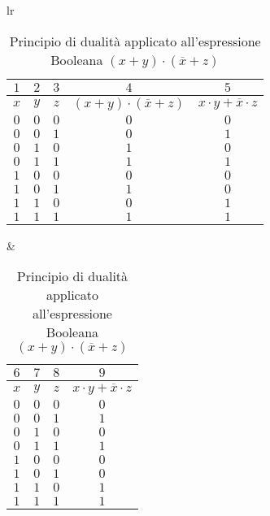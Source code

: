 \documentclass[a4paper]{extarticle}
\begin{document}
\begin{table}[H]
    \centering
    \begin{tabularx}{\textwidth}{lr}
        {
            \setlength{\tabcolsep}{8pt}
            \begin{tabularx}{0.5 \textwidth}{ccc|c|c}
                 \(1\) & \(2\) & \(3\) & \(4\) & \(5\)\\
                 \hline
                 \(x\) & \(y\) & \(z\) & \((x + y) \cdot (\overline{x} + z)\) & \(x \cdot y + \overline{x} \cdot z\)\\
                 \hline
                 \(0\) & \(0\) & \(0\) & \(0\) & \(0\)\\
                 \(0\) & \(0\) & \(1\) & \(0\) & \(1\)\\
                 \(0\) & \(1\) & \(0\) & \(1\) & \(0\)\\
                 \(0\) & \(1\) & \(1\) & \(1\) & \(1\)\\
                 \(1\) & \(0\) & \(0\) & \(0\) & \(0\)\\
                 \(1\) & \(0\) & \(1\) & \(1\) & \(0\)\\
                 \(1\) & \(1\) & \(0\) & \(0\) & \(1\)\\
                 \(1\) & \(1\) & \(1\) & \(1\) & \(1\)\\
            \end{tabularx}
        }
        &
        {
            \setlength{\tabcolsep}{8pt}
            \begin{tabularx}{0.3 \textwidth}{ccc|c}
                 \(6\) & \(7\) & \(8\) & \(9\)\\
                 \hline
                 \(x\) & \(y\) & \(z\) & \(x \cdot y + \overline{x} \cdot z\)\\
                 \hline
                 \(0\) & \(0\) & \(0\) & \(0\)\\
                 \(0\) & \(0\) & \(1\) & \(1\)\\
                 \(0\) & \(1\) & \(0\) & \(0\)\\
                 \(0\) & \(1\) & \(1\) & \(1\)\\
                 \(1\) & \(0\) & \(0\) & \(0\)\\
                 \(1\) & \(0\) & \(1\) & \(0\)\\
                 \(1\) & \(1\) & \(0\) & \(1\)\\
                 \(1\) & \(1\) & \(1\) & \(1\)\\
            \end{tabularx}
        }
    \end{tabularx}
    \caption{Principio di dualità applicato all'espressione Booleana \((x + y) \cdot (\overline{x} + z)\)}
    \label{tab:principio_dualita_espressione_booleana}
\end{table}
\end{document}
